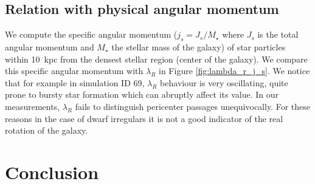 

\subsection{Relation with physical angular momentum}
We compute the specific angular momentum ($j_s = J_s/M_\star$ where $J_s$ is the total angular momentum and $M_\star$ the stellar mass of the galaxy) of star particles within 10~kpc from the densest stellar region (center of the galaxy).
We compare this specific angular momentum with $\lambda_R$ in Figure \ref{fig:lambda_r_j_s}.
We notice that for example in simulation ID 69, $\lambda_R$ behaviour is very oscillating, quite prone to bursty star formation which can abruptly affect its value.
In our measurements, $\lambda_R$ fails to distinguish pericenter passages unequivocally.
For these reasons in the case of dwarf irregulars it is not a good indicator of the real rotation of the galaxy.
% 

\section{Conclusion}


% 

